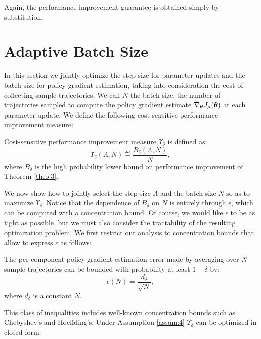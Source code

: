Again, the performance improvement guarantee is obtained simply by substitution.



\section{Adaptive Batch Size}\label{sec:batchsize}
In this section we jointly optimize the step size for parameter updates and the batch size for policy gradient estimation, taking into consideration the cost of collecting sample trajectories.
We call $N$ the batch size, \ie the number of trajectories sampled to compute the policy gradient estimate $\hat{\nabla}_{\boldsymbol{\theta}}J_{\mu}(\boldsymbol{\theta})$ at each parameter update.
We define the following cost-sensitive performance improvement measure:
\begin{definition}\label{def:1}
Cost-sensitive performance improvement measure $\Upsilon_{\delta}$ is defined as:
\[
\Upsilon_{\delta}(\Lambda,N)\eqdef \frac{B_{\delta}(\Lambda,N)}{N}, 
\]
where $B_{\delta}$ is the high probability lower bound on performance improvement of Theorem \ref{theo:3}.
\end{definition}

We now show how to jointly select the step size $\Lambda$ and the batch size $N$ so as to maximize $\Upsilon_{\delta}$.
Notice that the dependence of $B_{\delta}$ on $N$ is entirely through $\epsilon$, which can be computed with a concentration bound. Of course, we would like $\epsilon$ to be as tight as possible, but we must also consider the tractability of the resulting optimization problem. 
We first restrict our analysis to concentration bounds that allow to express $\epsilon$ as follows:
\begin{assumption}\label{assum:4}
The per-component policy gradient estimation error made by averaging over $N$ sample trajectories can be bounded with probability at least $1-\delta$ by:
\[
	\epsilon(N) = \frac{d_\delta}{\sqrt{N}},
\]
where $d_\delta$ is a constant \wrt $N$.
\end{assumption}
This class of inequalities includes well-known concentration bounds such as Chebyshev's and Hoeffding's.
Under Assumption \ref{assum:4} $\Upsilon_\delta$ can be optimized in closed form:

